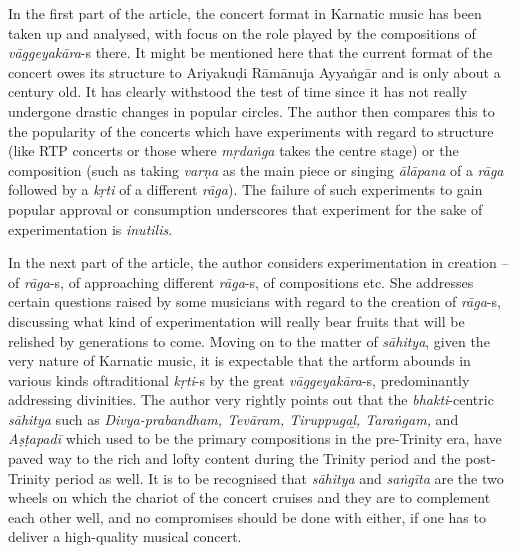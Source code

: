 In the first part of the article, the concert format in Karnatic music has been taken up and analysed, with focus on the role played by the compositions of \textit{vāggeyakāra}-s there. It might be mentioned here that the current format of the concert owes its structure to Ariyakuḍi Rāmānuja Ayyaṅgār and is only about a century old. It has clearly withstood the test of time since it has not really undergone drastic changes in popular circles. The author then compares this to the popularity of the concerts which have experiments with regard to structure (like RTP concerts or those where \textit{mṛdaṅga} takes the centre stage) or the composition (such as taking \textit{varṇa} as the main piece or singing \textit{ālāpana} of a \textit{rāga} followed by a \textit{kṛti} of a different \textit{rāga}). The failure of such experiments to gain popular approval or consumption underscores that experiment for the sake of experimentation is \textit{inutilis}.

\newpage

In the next part of the article, the author considers experimentation in creation – of \textit{rāga}-s, of approaching different \textit{rāga}-s, of compositions etc. She addresses certain questions raised by some musicians with regard to the creation of \textit{rāga}-s, discussing what kind of experimentation will really bear fruits that will be relished by generations to come. Moving on to the matter of \textit{sāhitya}, given the very nature of Karnatic music, it is expectable that the artform abounds in various kinds of\break traditional \textit{kṛti}-s by the great \textit{vāggeyakāra}-s, predominantly addressing divinities. The author very rightly points out that the \textit{bhakti}-centric \textit{sāhitya} such as \textit{Divya-prabandham, Tevāram, Tiruppugaḻ, Taraṅgam, }and\textit{ Aṣṭapadī} which used to be the primary compositions in the pre-Trinity era, have paved way to the rich and lofty content during the Trinity period and the post-Trinity period as well. It is to be recognised that \textit{sāhitya} and \textit{saṅgīta} are the two wheels on which the chariot of the concert cruises and they are to complement each other well, and no compromises should be done with either, if one has to deliver a high-quality musical concert.

